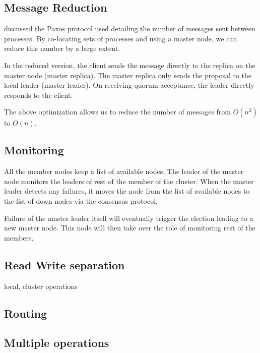 \subsection{Message Reduction}

 discussed the Paxos protocol used detailing the number
of messages sent between processes. By co-locating sets of processes and
using a master node, we can reduce this number by a large extent.

In the reduced version, the client sends the message directly to the
replica on the master node (master replica). The master replica only
sends the proposal to the local leader (master leader). On receiving quorum
acceptance, the leader directly responds to the client.

The above optimization allows us to reduce the number of messages from
$O(n^2)$ to $O(n)$.

\subsection{Monitoring}

All the member nodes%
keep a list of available nodes.
The leader of the master node monitors the leaders of rest of the member
of the cluster. When the master leader detects any failures, it moves the
node from the list of available nodes to the list of down nodes via the
consensus protocol.

Failure of the master leader itself will eventually trigger the election
leading to a new master node. This node will then take over the role of
monitoring rest of the members.

\subsection{Read Write separation}

local, cluster operations

\subsection{Routing}

\subsection{Multiple operations}

